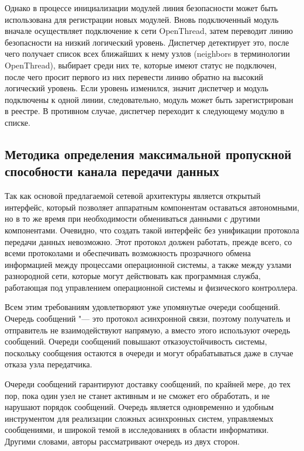 Однако в процессе инициализации модулей линия безопасности может быть использована для регистрации новых модулей. Вновь подключенный модуль вначале осуществляет подключение к сети OpenThread, затем переводит линию безопасности на низкий логический уровень. Диспетчер детектирует это, после чего получает список всех ближайших к нему узлов (neighbors в терминологии OpenThread), выбирает среди них те, которые имеют статус не подключен, после чего просит первого из них перевести линию обратно на высокий логический уровень. Если уровень изменился, значит диспетчер и модуль подключены к одной линии, следовательно, модуль может быть зарегистрирован в реестре. В противном случае, диспетчер переходит к следующему модулю в списке.

\subsection{Методика определения максимальной пропускной способности канала передачи данных}

Так как основой предлагаемой сетевой архитектуры является открытый интерфейс, который позволяет аппаратным компонентам оставаться автономными, но в то же время при необходимости обмениваться данными с другими компонентами. Очевидно, что создать такой интерфейс без унификации протокола передачи данных невозможно. Этот протокол должен работать, прежде всего, со всеми протоколами и обеспечивать возможность прозрачного обмена информацией между процессами операционной системы, а также между узлами разнородной сети, которые могут действовать как программная служба, работающая под управлением операционной системы и физического контроллера.

Всем этим требованиям удовлетворяют уже упомянутые очереди сообщений. Очередь сообщений "--- это протокол асинхронной связи, поэтому получатель и отправитель не взаимодействуют напрямую, а вместо этого используют очередь сообщений. Очереди сообщений повышают отказоустойчивость системы, поскольку сообщения остаются в очереди и могут обрабатываться даже в случае отказа узла передатчика.

Очереди сообщений гарантируют доставку сообщений, по крайней мере, до тех пор, пока один узел не станет активным и не сможет его обработать, и не нарушают порядок сообщений. Очередь является одновременно и удобным инструментом для реализации сложных асинхронных систем, управляемых сообщениями, и широкой темой в исследованиях в области информатики. Другими словами, авторы рассматривают очередь из двух сторон.

